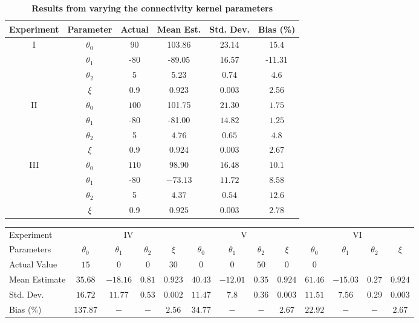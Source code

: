 \documentclass[12pt]{iopart}
\begin{document}
\begin{table}[!ht]
	\caption{
	\bf{Results from varying the connectivity kernel parameters}}
\begin{tabular}{c|ccccc}
	Experiment & Parameter & Actual & Mean Est. & Std. Dev. & Bias (\%) \\ \hline
	I &	$\theta_0$ & $90$ & 103.86 & 23.14 & 15.4 \\
	& $\theta_1$ & -80 & -89.05 & 16.57 & -11.31 \\
	& $\theta_2$ & 5 & 5.23 & 0.74 & 4.6 \\
	& $\xi$ & 0.9 & 0.923 & 0.003 & 2.56 \\ \hline	
	
	II & $\theta_0$ & $100$ & 101.75 & $21.30$ & $1.75$ \\
	& $\theta_1$ & -80 & -81.00 & $14.82$ & $1.25$ \\
	& $\theta_2$ & 5 & $4.76$ & $0.65$ & $4.8$ \\
	& $\xi$ & 0.9 & $0.924$ & $0.003$ & $2.67$ \\ \hline
	
	III & $\theta_0$ & $110$ & $98.90$ & $16.48$ & $10.1$ \\
	& $\theta_1$ & -80 & $-73.13$ & $11.72$ & $ 8.58$ \\
	& $\theta_2$ & 5 & $4.37$ & $0.54$ & $12.6$ \\
	& $\xi$ & 0.9 & $0.925$ & $0.003$ & $2.78$ \\ \hline
\end{tabular}\label{tab:MexicanHatKernelResults}
\end{table}

\tiny{\begin{tabular}{lcccccccccccc}
Experiment&\multicolumn{4}{c}{IV}&\multicolumn{4}{c}{V}&\multicolumn{4}{c}{VI}\\
 Parameters&$\theta_0$&$\theta_1$&$\theta_2$&$\xi$&$\theta_0$&$\theta_1$&$\theta_2$&$\xi$&$\theta_0$&$\theta_1$&$\theta_2$&$\xi$\\
\hline\hline
Actual Value&$15$&$0$&$0$&$30$&$0$&$0$&$50$&$0$&$0$\\
Mean Estimate&$35.68$&$-18.16$&$0.81$&$0.923$&$40.43$&$-12.01$&$ 0.35$&$0.924$&$61.46$&$-15.03$&$0.27$&$0.924$\\
Std. Dev.&$16.72$&$11.77$&$0.53$&$0.002$&$11.47$&$7.8$&$0.36$&$0.003$&$11.51$&$7.56$&$0.29$&$0.003$\\
Bias (\%)&$137.87$&$-$&$-$&$2.56$&$34.77$&$-$&$-$&$2.67$&$22.92$&$-$&$-$&$2.67$\\
\end{tabular}\label{tab:GaussianKernelResults}}
\end{document}
